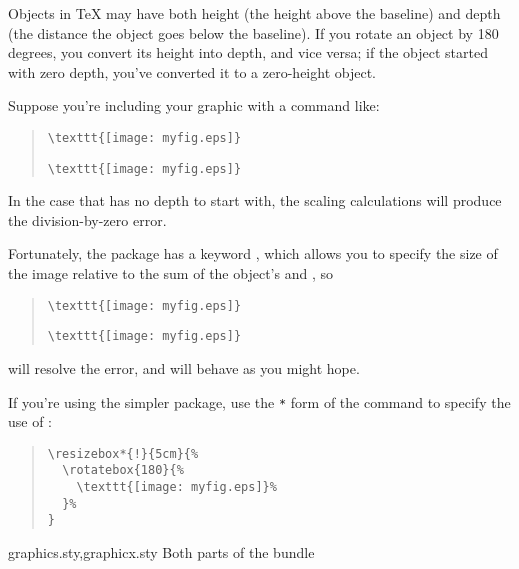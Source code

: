 {Objects in \TeX{} may have both height (the height above the baseline)
and depth (the distance the object goes below the baseline).  If you
rotate an object by 180\,degrees, you convert its height into depth,
and vice versa; if the object started with zero depth, you've
converted it to a zero-height object.

Suppose you're including your graphic with a command like:
\begin{quote}
\begin{wideversion}
\begin{verbatim}
\texttt{[image: myfig.eps]}
\end{verbatim}
\end{wideversion}
\begin{narrowversion}
\begin{verbatim}
\texttt{[image: myfig.eps]}
\end{verbatim}
\end{narrowversion}
\end{quote}
In the case that  has no depth to start with, the
scaling calculations will produce the division-by-zero error.

Fortunately, the  package has a keyword
, which allows you to specify the size of the
image relative to the sum of the object's  and
, so
\begin{quote}
\begin{wideversion}
\begin{verbatim}
\texttt{[image: myfig.eps]}
\end{verbatim}
\end{wideversion}
\begin{narrowversion}
\begin{verbatim}
\texttt{[image: myfig.eps]}
\end{verbatim}
\end{narrowversion}
\end{quote}
will resolve the error, and will behave as you might hope.

If you're using the simpler  package, use the
\texttt{*} form of the  command to specify the use of
:
\begin{quote}
\begin{verbatim}
\resizebox*{!}{5cm}{%
  \rotatebox{180}{%
    \texttt{[image: myfig.eps]}%
  }%
}
\end{verbatim}
\end{quote}
\begin{ctanrefs}
\item[graphics.sty,graphicx.sty]Both parts of the  bundle
\end{ctanrefs}

}
